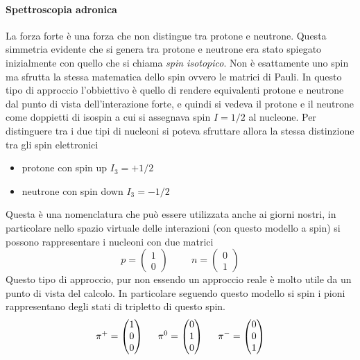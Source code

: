 \paragraph{Spettroscopia adronica}
La forza forte è una forza  che non distingue tra protone e neutrone.
Questa simmetria evidente che si genera tra protone e neutrone era stato spiegato inizialmente con quello che si chiama \emph{spin isotopico}.
Non è esattamente uno spin ma sfrutta la stessa matematica dello spin ovvero le matrici di Pauli.
In questo tipo di approccio l'obbiettivo è quello di rendere equivalenti protone e neutrone dal punto di vista dell'interazione forte, e quindi si vedeva il protone e il neutrone come doppietti di isospin a cui si assegnava spin $I=1/2$ al nucleone.
Per distinguere tra i due tipi di nucleoni si poteva sfruttare allora la stessa distinzione tra gli spin elettronici
\begin{itemize}
\item protone con spin up $I_3=+1/2$
\item neutrone con spin down $I_3=-1/2$
\end{itemize}
Questa è una nomenclatura che può essere utilizzata anche ai giorni nostri, in particolare nello spazio virtuale delle interazioni (con questo modello a spin) si possono rappresentare i nucleoni con due matrici
\begin{equation}
p=
\begin{pmatrix}
1\\0
\end{pmatrix}
\hspace{1cm}
n=
\begin{pmatrix}
0\\1
\end{pmatrix}
\end{equation}
Questo tipo di approccio, pur non essendo un approccio reale è molto utile da un punto di vista del calcolo.
In particolare seguendo questo modello si spin i pioni rappresentano degli stati di tripletto di questo spin.
\begin{equation}
\pi^+=
\begin{pmatrix}
1\\0\\0
\end{pmatrix}
\hspace{0.5cm}
\pi^0=
\begin{pmatrix}
0\\1\\0
\end{pmatrix}
\hspace{0.5cm}
\pi^-=
\begin{pmatrix}
0\\0\\1
\end{pmatrix}
\end{equation}
